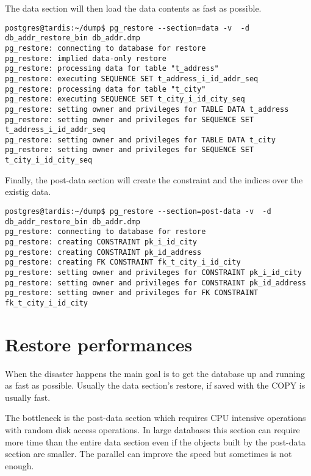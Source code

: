 The data section will then load the data contents as fast as possible.

\begin{verbatim}
postgres@tardis:~/dump$ pg_restore --section=data -v  -d db_addr_restore_bin db_addr.dmp 
pg_restore: connecting to database for restore
pg_restore: implied data-only restore
pg_restore: processing data for table "t_address"
pg_restore: executing SEQUENCE SET t_address_i_id_addr_seq
pg_restore: processing data for table "t_city"
pg_restore: executing SEQUENCE SET t_city_i_id_city_seq
pg_restore: setting owner and privileges for TABLE DATA t_address
pg_restore: setting owner and privileges for SEQUENCE SET t_address_i_id_addr_seq
pg_restore: setting owner and privileges for TABLE DATA t_city
pg_restore: setting owner and privileges for SEQUENCE SET t_city_i_id_city_seq

\end{verbatim}

Finally, the post-data section will create the constraint and the indices over the existig data.

\begin{verbatim}
postgres@tardis:~/dump$ pg_restore --section=post-data -v  -d db_addr_restore_bin db_addr.dmp 
pg_restore: connecting to database for restore
pg_restore: creating CONSTRAINT pk_i_id_city
pg_restore: creating CONSTRAINT pk_id_address
pg_restore: creating FK CONSTRAINT fk_t_city_i_id_city
pg_restore: setting owner and privileges for CONSTRAINT pk_i_id_city
pg_restore: setting owner and privileges for CONSTRAINT pk_id_address
pg_restore: setting owner and privileges for FK CONSTRAINT fk_t_city_i_id_city

\end{verbatim}


\section{Restore performances}

When the disaster happens the main goal is to get the database up and running as fast as possible. 
Usually the data section's restore, if saved with the COPY is usually fast.\newline 

The bottleneck is the post-data section which requires CPU intensive operations with random disk access 
operations. In large databases this section can require more time than the entire data section even 
if the objects built by the post-data section are smaller. The parallel can improve the speed but 
sometimes is not enough. \newline

